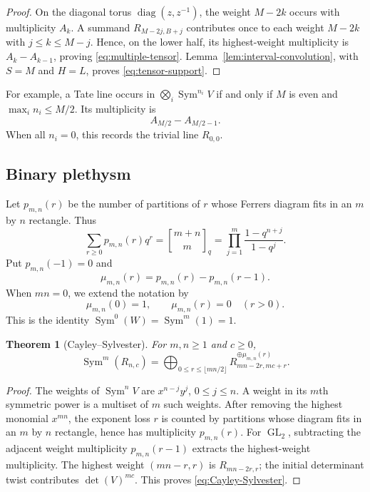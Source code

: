 \documentclass[11pt,reqno]{amsart}
\newtheorem{theorem}{Theorem}[section]
\theoremstyle{definition}
\theoremstyle{remark}
\newcommand{\GL}{\operatorname{GL}}
\newcommand{\Sym}{\operatorname{Sym}}
\newcommand{\qbinom}[2]{\genfrac{[}{]}{0pt}{}{#1}{#2}}
\begin{document}
\begin{proof}
On the diagonal torus $\operatorname{diag}(z,z^{-1})$, the weight $M-2k$
occurs with multiplicity $A_k$.  A summand $R_{M-2j,B+j}$ contributes once
to each weight $M-2k$ with $j\leq k\leq M-j$.  Hence, on the lower half,
its highest-weight multiplicity is $A_k-A_{k-1}$, proving
\eqref{eq:multiple-tensor}.  Lemma~\ref{lem:interval-convolution}, with
$S=M$ and $H=L$, proves \eqref{eq:tensor-support}.
\end{proof}

For example, a Tate line occurs in $\bigotimes_i\Sym^{n_i}V$ if and only if
$M$ is even and $\max_i n_i\leq M/2$.  Its multiplicity is
\begin{equation}\label{eq:tensor-Tate-mult}
 A_{M/2}-A_{M/2-1}.
\end{equation}
When all $n_i=0$, this records the trivial line $R_{0,0}$.

\subsection{Binary plethysm}

Let $p_{m,n}(r)$ be the number of partitions of $r$ whose Ferrers diagram fits
in an $m$ by $n$ rectangle.  Thus
\begin{equation}\label{eq:q-binomial}
 \sum_{r\geq0}p_{m,n}(r)q^r
 =\qbinom{m+n}{m}_q
 =\prod_{j=1}^{m}\frac{1-q^{n+j}}{1-q^j}.
\end{equation}
Put $p_{m,n}(-1)=0$ and
\begin{equation}\label{eq:mu-def}
 \mu_{m,n}(r)=p_{m,n}(r)-p_{m,n}(r-1).
\end{equation}
When $mn=0$, we extend the notation by
\begin{equation}\label{eq:mu-zero-convention}
 \mu_{m,n}(0)=1,\qquad \mu_{m,n}(r)=0\quad(r>0).
\end{equation}
This is the identity $\Sym^0(W)=\Sym^m(1)=1$.

\begin{theorem}[Cayley--Sylvester]\label{thm:Cayley-Sylvester}
For $m,n\geq1$ and $c\geq0$,
\begin{equation}\label{eq:Cayley-Sylvester}
 \Sym^m(R_{n,c})
 =
 \bigoplus_{0\leq r\leq\lfloor mn/2\rfloor}
 R_{mn-2r,mc+r}^{\oplus\mu_{m,n}(r)}.
\end{equation}
\end{theorem}

\begin{proof}
The weights of $\Sym^nV$ are $x^{n-j}y^j$, $0\leq j\leq n$.  A weight in
its $m$th symmetric power is a multiset of $m$ such weights.  After removing
the highest monomial $x^{mn}$, the exponent loss $r$ is counted by partitions
whose diagram fits in an $m$ by $n$ rectangle, hence has multiplicity
$p_{m,n}(r)$.  For $\GL_2$, subtracting the adjacent weight multiplicity
$p_{m,n}(r-1)$ extracts the highest-weight multiplicity.  The highest weight
$(mn-r,r)$ is $R_{mn-2r,r}$; the initial determinant twist contributes
$\det(V)^{mc}$.  This proves \eqref{eq:Cayley-Sylvester}.
\end{proof}
\end{document}
